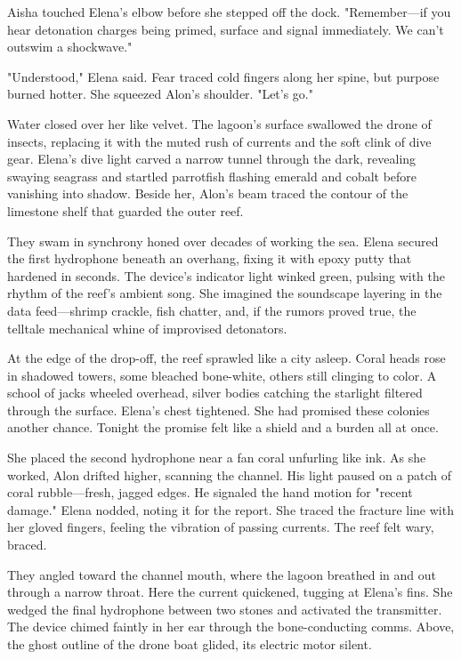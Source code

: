 Aisha touched Elena's elbow before she stepped off the dock. "Remember—if you hear detonation charges being primed, surface and signal immediately. We can't outswim a shockwave."

"Understood," Elena said. Fear traced cold fingers along her spine, but purpose burned hotter. She squeezed Alon's shoulder. "Let's go."

\bigskip

Water closed over her like velvet. The lagoon's surface swallowed the drone of insects, replacing it with the muted rush of currents and the soft clink of dive gear. Elena's dive light carved a narrow tunnel through the dark, revealing swaying seagrass and startled parrotfish flashing emerald and cobalt before vanishing into shadow. Beside her, Alon's beam traced the contour of the limestone shelf that guarded the outer reef.

They swam in synchrony honed over decades of working the sea. Elena secured the first hydrophone beneath an overhang, fixing it with epoxy putty that hardened in seconds. The device's indicator light winked green, pulsing with the rhythm of the reef's ambient song. She imagined the soundscape layering in the data feed—shrimp crackle, fish chatter, and, if the rumors proved true, the telltale mechanical whine of improvised detonators.

At the edge of the drop-off, the reef sprawled like a city asleep. Coral heads rose in shadowed towers, some bleached bone-white, others still clinging to color. A school of jacks wheeled overhead, silver bodies catching the starlight filtered through the surface. Elena's chest tightened. She had promised these colonies another chance. Tonight the promise felt like a shield and a burden all at once.

She placed the second hydrophone near a fan coral unfurling like ink. As she worked, Alon drifted higher, scanning the channel. His light paused on a patch of coral rubble—fresh, jagged edges. He signaled the hand motion for "recent damage." Elena nodded, noting it for the report. She traced the fracture line with her gloved fingers, feeling the vibration of passing currents. The reef felt wary, braced.

They angled toward the channel mouth, where the lagoon breathed in and out through a narrow throat. Here the current quickened, tugging at Elena's fins. She wedged the final hydrophone between two stones and activated the transmitter. The device chimed faintly in her ear through the bone-conducting comms. Above, the ghost outline of the drone boat glided, its electric motor silent.

